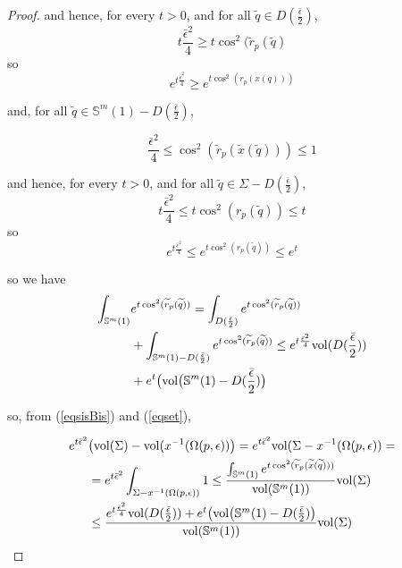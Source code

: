 \documentclass{amsart}
\theoremstyle{definition}
\theoremstyle{remark}
\newcommand{\ese}{\mathbb{S}}
\begin{document}
\begin{proof}
\noindent and hence, for every $t >0$, and for all $\widetilde{q} \in  D(\frac{\bar\epsilon}{2})$, $$t\frac{\bar\epsilon^2}{4} \geq t\cos^2(\widetilde{r}_p(\widetilde{q})$$
\noindent so $$e^{t\frac{\bar\epsilon^2}{4} } \geq e^{t\cos^2(r_p(x(q)))}$$

\noindent and, for all $\widetilde{q} \in \ese^m(1)-D(\frac{\bar\epsilon}{2})$,

$$\frac{\bar\epsilon^2}{4} \leq \cos^2(\widetilde{r}_p(\widetilde{x}(\widetilde{q})))\leq  1 $$

\noindent and hence, for every $t >0$, and for all $\widetilde{q} \in \Sigma- D(\frac{\bar\epsilon}{2})$,$$t\frac{\bar\epsilon^2}{4}\leq t \cos^2(r_p(\widetilde{q}))\leq t$$
\noindent so $$e^{t\frac{\bar\epsilon^2}{4}} \leq e^{t\cos^2(r_p(\widetilde{q}))} \leq e^t$$



\noindent so we have
\begin{equation}\label{eqset}
\begin{aligned}
\int_{\mathbb{S}^m(1)} &e^{t\cos^2(\widetilde{r}_p(\widetilde{q}))} =\int_{D(\frac{\bar\epsilon}{2})}e^{t \cos^2(\widetilde{r}_p(\widetilde{q}))} \\&+\int_{\mathbb{S}^m(1)-D(\frac{\bar\epsilon}{2})} e^{t\cos^2(\widetilde{r}_p(\widetilde{q}))}
\leq e^{t\frac{ \bar\epsilon^2}{4} }{\rm vol}(D(\frac{\bar\epsilon}{2})) 
\\&+e^t \big({\rm vol}\big(\mathbb{S}^m(1)-D(\frac{\bar\epsilon}{2})\big)
\end{aligned}
\end{equation}

\noindent so, from (\ref{eqsisBis}) and (\ref{eqset}),

\begin{equation}\label{eqvuit}
 \begin{aligned}
e^{t\bar\epsilon^2}&\big({\rm vol}(\Sigma)-{\rm vol}(x^{-1}(\Omega(p,\epsilon))\big)=e^{t\bar\epsilon^2}{\rm vol}(\Sigma-x^{-1}(\Omega(p,\epsilon))=\\&=e^{t\bar\epsilon^2}\int_{\Sigma-x^{-1}(\Omega(p,\epsilon))} 1 \leq \frac{\int_{\mathbb{S}^m(1)}e^{t \cos^2(\widetilde{r}_p(\widetilde{x}(\widetilde{q})))}}{{\rm vol}(\mathbb{S}^m(1))} {\rm vol}(\Sigma)\\
&\leq \frac{e^{t\frac{ \bar\epsilon^2}{4} }{\rm vol}(D(\frac{\bar\epsilon}{2})) 
+e^t \big({\rm vol}\big(\mathbb{S}^m(1)-D(\frac{\bar\epsilon}{2})\big)}{{\rm vol}(\mathbb{S}^m(1))}{\rm vol}(\Sigma)
\end{aligned}
\end{equation}


\end{proof}
\end{document}
